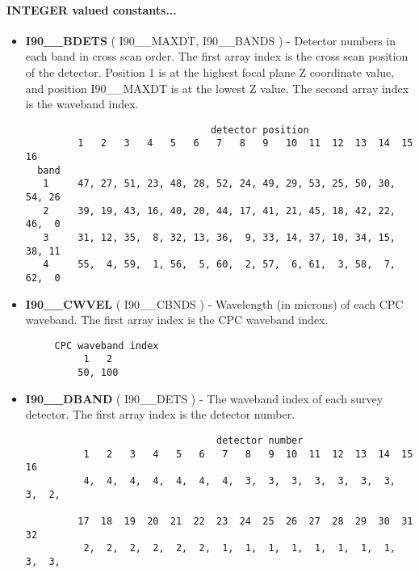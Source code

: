\paragraph{INTEGER valued constants...}
\begin{itemize}
\item {\bf I90\_\_BDETS} ( I90\_\_MAXDT, I90\_\_BANDS ) - Detector numbers in each band in
cross scan order. The first array index is the cross scan position of the detector.
Position 1 is at the highest focal plane Z coordinate value, and position
I90\_\_MAXDT is at the lowest Z value. The second array index is the waveband
index.

\begin{minipage}[t]{\textwidth}
\small
\begin{verbatim}
                                detector position
         1   2   3   4   5   6   7   8   9   10  11  12  13  14  15  16
  band
   1     47, 27, 51, 23, 48, 28, 52, 24, 49, 29, 53, 25, 50, 30, 54, 26
   2     39, 19, 43, 16, 40, 20, 44, 17, 41, 21, 45, 18, 42, 22, 46,  0
   3     31, 12, 35,  8, 32, 13, 36,  9, 33, 14, 37, 10, 34, 15, 38, 11
   4     55,  4, 59,  1, 56,  5, 60,  2, 57,  6, 61,  3, 58,  7, 62,  0
\end{verbatim}
\normalsize
\end{minipage}

\item {\bf I90\_\_CWVEL} ( I90\_\_CBNDS ) - Wavelength (in microns) of each CPC waveband.
The first array index is the CPC waveband index.

\begin{minipage}[t]{\textwidth}
\small
\begin{verbatim}
     CPC waveband index
          1   2
         50, 100
\end{verbatim}
\normalsize
\end{minipage}

\item {\bf I90\_\_DBAND} ( I90\_\_DETS ) - The waveband index of each survey detector.
The first array index is the detector number.

\begin{minipage}[t]{\textwidth}
\small
\begin{verbatim}
                                 detector number
          1   2   3   4   5   6   7   8   9  10  11  12  13  14  15  16
          4,  4,  4,  4,  4,  4,  4,  3,  3,  3,  3,  3,  3,  3,  3,  2,

         17  18  19  20  21  22  23  24  25  26  27  28  29  30  31  32
          2,  2,  2,  2,  2,  2,  1,  1,  1,  1,  1,  1,  1,  1,  3,  3,


\end{verbatim}
\end{minipage}
\end{itemize}
